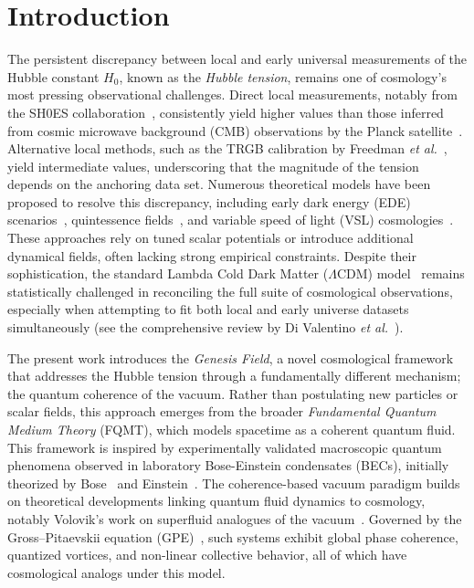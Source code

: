 \section{Introduction}
\label{sec:introduction}

The persistent discrepancy between local and early universal measurements of the Hubble constant \( H_0 \), known as the \textit{Hubble tension}, remains one of cosmology's most pressing observational challenges. Direct local measurements, notably from the SH0ES collaboration~\cite{Riess2022}, consistently yield higher values than those inferred from cosmic microwave background (CMB) observations by the Planck satellite~\cite{Planck2020}. Alternative local methods, such as the TRGB calibration by Freedman \textit{et al.}~\cite{Freedman2021}, yield intermediate values, underscoring that the magnitude of the tension depends on the anchoring data set. Numerous theoretical models have been proposed to resolve this discrepancy, including early dark energy (EDE) scenarios~\cite{divalentino2021realm}, quintessence fields~\cite{Caldwell1998}, and variable speed of light (VSL) cosmologies~\cite{Magueijo2003}. These approaches rely on tuned scalar potentials or introduce additional dynamical fields, often lacking strong empirical constraints. Despite their sophistication, the standard Lambda Cold Dark Matter (\(\Lambda\)CDM) model~\cite{Weinberg2013} remains statistically challenged in reconciling the full suite of cosmological observations, especially when attempting to fit both local and early universe datasets simultaneously (see the comprehensive review by Di Valentino \textit{et al.}~\cite{divalentino2021realm}).

The present work introduces the \textit{Genesis Field}, a novel cosmological framework that addresses the Hubble tension through a fundamentally different mechanism; the quantum coherence of the vacuum. Rather than postulating new particles or scalar fields, this approach emerges from the broader \textit{Fundamental Quantum Medium Theory} (FQMT), which models spacetime as a coherent quantum fluid. This framework is inspired by experimentally validated macroscopic quantum phenomena observed in laboratory Bose-Einstein condensates (BECs), initially theorized by Bose~\cite{Bose1924} and Einstein~\cite{Einstein1925}. The coherence-based vacuum paradigm builds on theoretical developments linking quantum fluid dynamics to cosmology, notably Volovik's work on superfluid analogues of the vacuum~\cite{volovik2003universe}. Governed by the Gross–Pitaevskii equation (GPE)~\cite{Gross1961,Pitaevskii1961}, such systems exhibit global phase coherence, quantized vortices, and non-linear collective behavior, all of which have cosmological analogs under this model.

